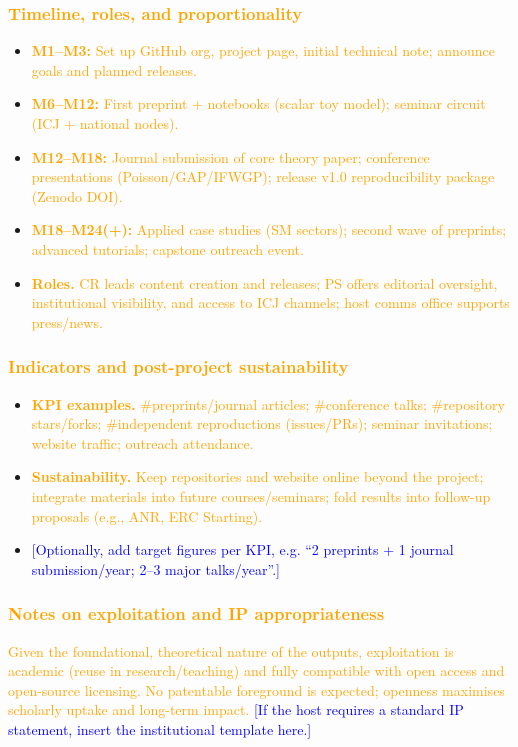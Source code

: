 \documentclass[11pt,draftproposal]{msca-pf}
\begin{document}
\subsubsection*{\textcolor{orange}{Timeline, roles, and proportionality}}
\begin{itemize}[noitemsep,topsep=2pt]
  \item \textcolor{orange}{\textbf{M1–M3:} Set up GitHub org, project page, initial technical note; announce goals and planned releases.}
  \item \textcolor{orange}{\textbf{M6–M12:} First preprint + notebooks (scalar toy model); seminar circuit (ICJ + national nodes).}
  \item \textcolor{orange}{\textbf{M12–M18:} Journal submission of core theory paper; conference presentations (Poisson/GAP/IFWGP); release v1.0 reproducibility package (Zenodo DOI).}
  \item \textcolor{orange}{\textbf{M18–M24(+):} Applied case studies (SM sectors); second wave of preprints; advanced tutorials; capstone outreach event.}
  \item \textcolor{orange}{\textbf{Roles.} CR leads content creation and releases; PS offers editorial oversight, institutional visibility, and access to ICJ channels; host comms office supports press/news.}
\end{itemize}

\subsubsection*{\textcolor{orange}{Indicators and post-project sustainability}}
\begin{itemize}[noitemsep,topsep=2pt]
  \item \textcolor{orange}{\textbf{KPI examples.} \#preprints/journal articles; \#conference talks; \#repository stars/forks; \#independent reproductions (issues/PRs); seminar invitations; website traffic; outreach attendance.}
  \item \textcolor{orange}{\textbf{Sustainability.} Keep repositories and website online beyond the project; integrate materials into future courses/seminars; fold results into follow-up proposals (e.g., ANR, ERC Starting).}
  \item \textcolor{blue}{[Optionally, add target figures per KPI, e.g. “2 preprints + 1 journal submission/year; 2–3 major talks/year”.]}
\end{itemize}

\subsubsection*{\textcolor{orange}{Notes on exploitation and IP appropriateness}}
\textcolor{orange}{Given the foundational, theoretical nature of the outputs, exploitation is academic (reuse in research/teaching) and fully compatible with open access and open-source licensing. No patentable foreground is expected; openness maximises scholarly uptake and long-term impact.}
\textcolor{blue}{[If the host requires a standard IP statement, insert the institutional template here.]}
\end{document}
